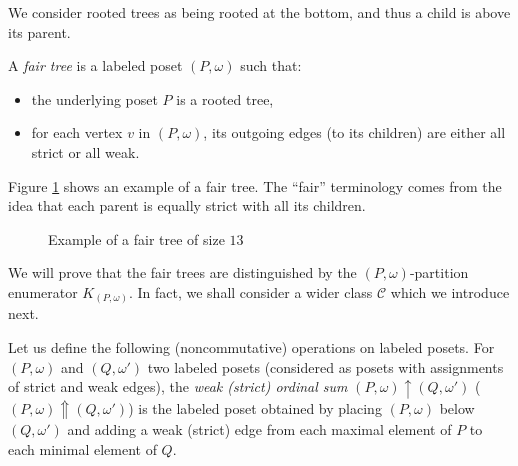 \documentclass[ALCO,Unicode,published]{cedram}
\newcommand{\om}{\omega}
\newcommand{\kpw}{K_{(P,\om)}}
\newcommand{\Cb}{\mathcal{C}}
\newcommand{\wP}{\uparrow}
\newcommand{\sP}{\Uparrow}
\begin{document}
We consider rooted trees as being rooted at the bottom, and thus a child is above its parent. 

\begin{definition}
A {\em fair tree} is a labeled poset $(P,\om)$ such that:
\begin{itemize}
\item the underlying poset $P$ is a rooted tree,
\item for each vertex $v$ in $(P,\om)$, its outgoing edges (to its children) are either all strict or all weak.
\end{itemize} 
\end{definition}
Figure \ref{fig:fair-tree-ex} shows an example of a fair tree.  The ``fair'' terminology comes from the idea that each parent is equally strict with all its children.  

\begin{figure}
\begin{center}
\end{center}
\caption{Example of a fair tree of size $13$}
\label{fig:fair-tree-ex}
\end{figure}

We will prove that the fair trees are distinguished by the $(P,\om)$-partition enumerator $\kpw$.  In fact, we shall consider a wider class $\Cb$ which we introduce next.  

Let us define the following (noncommutative) operations on labeled posets.
For $(P,\om)$ and $(Q,\om')$ two labeled posets (considered as posets with assignments of strict and weak edges),
the \emph{weak (\resp strict) ordinal sum} $(P,\om)\wP (Q,\om')$ (\resp $(P,\om)\sP (Q,\om')$) is the labeled poset obtained 
by placing $(P,\om)$ below $(Q,\om')$ 
and adding a weak (\resp strict) edge from each maximal element of $P$ to each minimal element of $Q$.  
\end{document}
